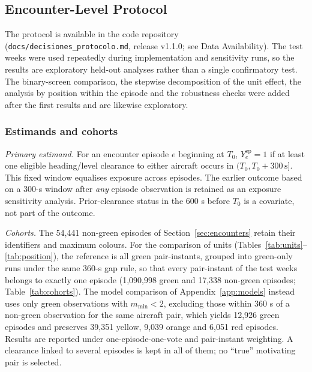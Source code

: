 \documentclass[aerospace,article,submit,moreauthors]{Definitions/mdpi}
\newcommand{\mmin}{m_{\min}}
\begin{document}
\subsection{Encounter-Level Protocol}\label{sec:benchmarks}
The protocol is available in the code repository (\texttt{docs/decisiones\_protocolo.md}, release v1.1.0; see Data Availability). The test weeks were used repeatedly during implementation and sensitivity runs, so the results are exploratory held-out analyses rather than a single confirmatory test. The binary-screen comparison, the stepwise decomposition of the unit effect, the analysis by position within the episode and the robustness checks were added after the first results and are likewise exploratory.

\subsubsection{Estimands and cohorts}
\emph{Primary estimand.} For an encounter episode $e$ beginning at $T_0$, $Y^{\mathrm{ep}}_e=1$ if at least one eligible heading/level clearance to either aircraft occurs in $(T_0,T_0+300\,\mathrm{s}]$. This fixed window equalises exposure across episodes. The earlier outcome based on a 300-s window after \emph{any} episode observation is retained as an exposure sensitivity analysis. Prior-clearance status in the 600 s before $T_0$ is a covariate, not part of the outcome.

\emph{Cohorts.} The 54,441 non-green episodes of Section~\ref{sec:encounters} retain their identifiers and maximum colours. For the comparison of units (Tables~\ref{tab:units}--\ref{tab:position}), the reference is all green pair-instants, grouped into green-only runs under the same 360-s gap rule, so that every pair-instant of the test weeks belongs to exactly one episode (1,090,998 green and 17,338 non-green episodes; Table~\ref{tab:cohorts}). The model comparison of Appendix~\ref{app:models} instead uses only green observations with $\mmin<2$, excluding those within 360 s of a non-green observation for the same aircraft pair, which yields 12,926 green episodes and preserves 39,351 yellow, 9,039 orange and 6,051 red episodes. Results are reported under one-episode-one-vote and pair-instant weighting. A clearance linked to several episodes is kept in all of them; no ``true'' motivating pair is selected.
\end{document}
